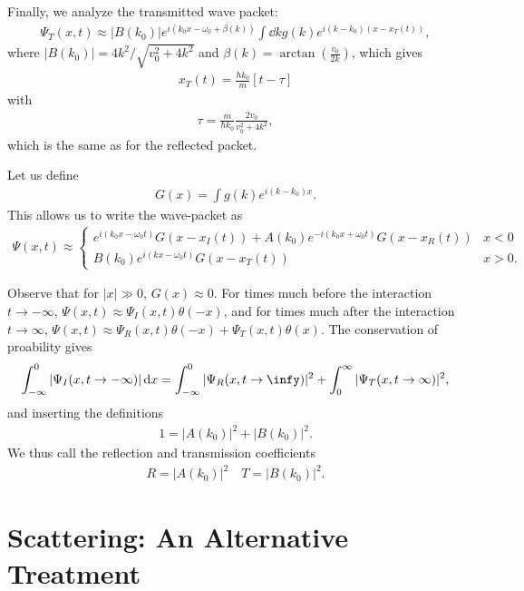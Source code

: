 Finally, we analyze the transmitted wave packet:
\begin{eqnarray}
    \Psi_{T}(x,t) \approx |B(k_0)| e^{i(k_0x - \omega_0 + \beta(k))} \int \dd{k} g(k) e^{i(k - k_0)(x - x_{T}(t))}
,\end{eqnarray}
where $|B(k_0)| = 4k^2/\sqrt{v_0^2 + 4k^2}$ and $\beta(k) = \arctan(\frac{v_0}{2k})$, which gives
\begin{eqnarray}
    x_{T}(t) = \frac{\hbar k_0}{m} [t - \tau ]
\end{eqnarray}
with
\begin{eqnarray}
    \tau = \frac{m}{\hbar k_0} \frac{2v_0}{v_0^2 + 4k^2}
,\end{eqnarray}
which is the same as for the reflected packet.

Let us define
\begin{eqnarray}
    G(x) = \int g(k) e^{i(k-k_0)x}
.\end{eqnarray}
This allows us to write the wave-packet as
\begin{align}
    \Psi(x,t) \approx \begin{cases}
        e^{i(k_0 x - \omega_0 t)} G(x - x_{I}(t)) + A(k_0) e^{-i(k_0x + \omega_0 t)} G(x - x_{R}(t)) & x < 0 \\
        B(k_0) e^{i(kx - \omega_0 t)} G(x - x_{T}(t)) & x > 0
    .\end{cases}
\end{align}

Observe that for $|x| \gg 0$, $G(x) \approx 0$.
For times much before the interaction $t \rightarrow -\infty$, $\Psi(x,t) \approx \Psi_{I}(x,t) \theta(-x)$, and for times much after the interaction $t \rightarrow \infty$, $\Psi(x,t) \approx \Psi_{R}(x,t)\theta(-x) + \Psi_{T}(x,t)\theta(x)$.
The conservation of proability gives
\begin{eqnarray}
    \int_{-\infty}^{0} |\Psi_{I}(x,t \rightarrow -\infty)| \dd{x} = \int_{-\infty}^{0} |\Psi_{R}(x,t\rightarrow \infy)|^2 + \int_{0}^{\infty} |\Psi_{T}(x,t \rightarrow \infty)|^2
,\end{eqnarray}
and inserting the definitions
\begin{eqnarray}
    1 = |A(k_0)|^2 + |B(k_0)|^2
.\end{eqnarray}
We thus call the reflection and transmission coefficients
\begin{eqnarray}
    R = |A(k_0)|^2 \quad T = |B(k_0)|^2
.\end{eqnarray}


\section{Scattering: An Alternative Treatment}

